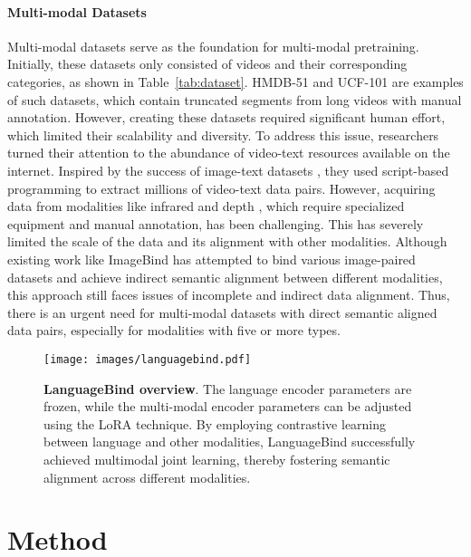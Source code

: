 \documentclass{article} \usepackage{iclr2024_conference,times}
\begin{document}
\paragraph{Multi-modal Datasets} 
Multi-modal datasets serve as the foundation for multi-modal pretraining. Initially, these datasets only consisted of videos and their corresponding categories, as shown in Table~\ref{tab:dataset}. HMDB-51 \citep{kuehne2011hmdb} and UCF-101 \citep{soomro2012ucf101} are examples of such datasets, which contain truncated segments from long videos with manual annotation. However, creating these datasets required significant human effort, which limited their scalability and diversity. To address this issue, researchers turned their attention to the abundance of video-text resources available on the internet. Inspired by the success of image-text datasets \citep{sharma2018conceptual, changpinyo2021conceptual}, they used script-based programming \citep{schuldt2004recognizing,kong2019mmact, sigurdsson2018charades} to extract millions of video-text data pairs. However, acquiring data from modalities like infrared \citep{flirv1, flirv2} and depth \citep{silberman2012indoor}, which require specialized equipment and manual annotation, has been challenging. This has severely limited the scale of the data and its alignment with other modalities. Although existing work like ImageBind \citep{girdhar2023imagebind} has attempted to bind various image-paired datasets and achieve indirect semantic alignment between different modalities, this approach still faces issues of incomplete and indirect data alignment. Thus, there is an urgent need for multi-modal datasets with direct semantic aligned data pairs, especially for modalities with five or more types.


\begin{figure*}[htbp]
\centering
    \texttt{[image: images/languagebind.pdf]}     
\caption{
\textbf{LanguageBind overview}. The language encoder parameters are frozen, while the multi-modal encoder parameters can be adjusted using the LoRA technique. By employing contrastive learning between language and other modalities, LanguageBind successfully achieved multimodal joint learning, thereby fostering semantic alignment across different modalities.
} \label{fig:languagebind_method}
\vspace{-0.4cm}
\end{figure*}



\section{Method}
\end{document}
